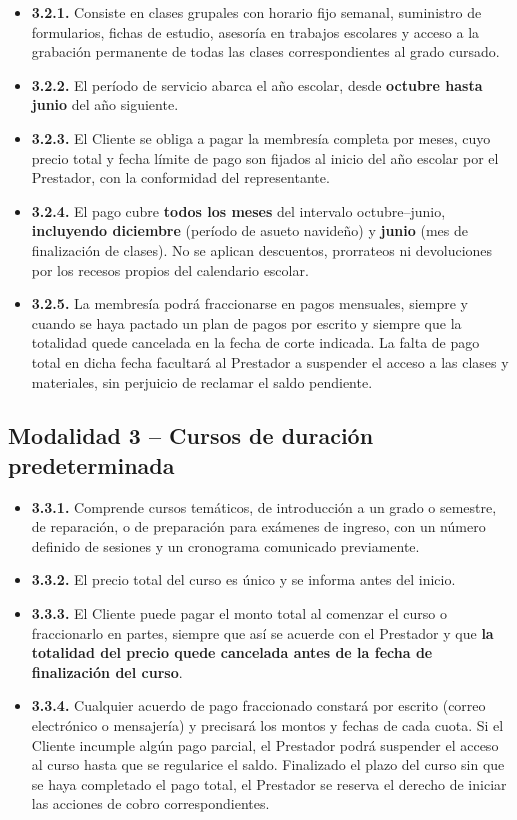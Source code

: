 \documentclass[12pt, letterpaper]{article}
\begin{document}
\begin{itemize}[leftmargin=1.5em, itemsep=3pt, topsep=4pt]
  \item \textbf{3.2.1.} Consiste en clases grupales con horario fijo semanal, suministro de formularios, fichas de estudio, asesoría en trabajos escolares y acceso a la grabación permanente de todas las clases correspondientes al grado cursado.
  \item \textbf{3.2.2.} El período de servicio abarca el año escolar, desde \textbf{octubre hasta junio} del año siguiente.
  \item \textbf{3.2.3.} El Cliente se obliga a pagar la membresía completa por meses, cuyo precio total y fecha límite de pago son fijados al inicio del año escolar por el Prestador, con la conformidad del representante.
  \item \textbf{3.2.4.} El pago cubre \textbf{todos los meses} del intervalo octubre--junio, \textbf{incluyendo diciembre} (período de asueto navideño) y \textbf{junio} (mes de finalización de clases). No se aplican descuentos, prorrateos ni devoluciones por los recesos propios del calendario escolar.
  \item \textbf{3.2.5.} La membresía podrá fraccionarse en pagos mensuales, siempre y cuando se haya pactado un plan de pagos por escrito y siempre que la totalidad quede cancelada en la fecha de corte indicada. La falta de pago total en dicha fecha facultará al Prestador a suspender el acceso a las clases y materiales, sin perjuicio de reclamar el saldo pendiente.
\end{itemize}

\subsection{Modalidad 3 -- Cursos de duración predeterminada}

\begin{itemize}[leftmargin=1.5em, itemsep=3pt, topsep=4pt]
  \item \textbf{3.3.1.} Comprende cursos temáticos, de introducción a un grado o semestre, de reparación, o de preparación para exámenes de ingreso, con un número definido de sesiones y un cronograma comunicado previamente.
  \item \textbf{3.3.2.} El precio total del curso es único y se informa antes del inicio.
  \item \textbf{3.3.3.} El Cliente puede pagar el monto total al comenzar el curso o fraccionarlo en partes, siempre que así se acuerde con el Prestador y que \textbf{la totalidad del precio quede cancelada antes de la fecha de finalización del curso}.
  \item \textbf{3.3.4.} Cualquier acuerdo de pago fraccionado constará por escrito (correo electrónico o mensajería) y precisará los montos y fechas de cada cuota. Si el Cliente incumple algún pago parcial, el Prestador podrá suspender el acceso al curso hasta que se regularice el saldo. Finalizado el plazo del curso sin que se haya completado el pago total, el Prestador se reserva el derecho de iniciar las acciones de cobro correspondientes.
\end{itemize}
\end{document}
